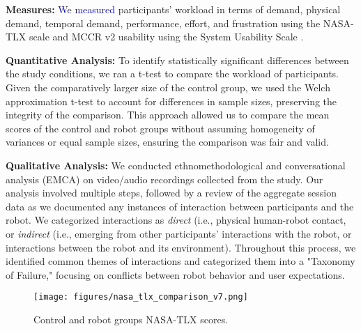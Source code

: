 \textbf{Measures:} \textcolor{blue}{We measured} participants' workload in terms of demand, physical demand, temporal demand, performance, effort, and frustration using the NASA-TLX scale \cite{hart2006nasa} and MCCR v2 usability using the System Usability Scale \cite{brooke1996sus}.


\textbf{Quantitative Analysis:} To identify statistically significant differences between the study conditions, we ran a t-test to compare the workload of participants. Given the comparatively larger size of the control group, we used the Welch approximation t-test to account for differences in sample sizes, preserving the integrity of the comparison. This approach allowed us to compare the mean scores of the control and robot groups without assuming homogeneity of variances or equal sample sizes, ensuring the comparison was fair and valid.

\textbf{Qualitative Analysis:} We conducted ethnomethodological and conversational analysis (EMCA) \cite{haddington2023emca} on video/audio recordings collected from the study. Our analysis involved multiple steps, followed by a review of the aggregate session data as we documented any instances of interaction between participants and the robot. We categorized interactions as \textit{direct} (i.e., physical human-robot contact, %
or \textit{indirect} (i.e., emerging from other participants' interactions with the robot, or interactions between the robot and its environment). Throughout this process, we identified common themes of interactions and categorized them into a "Taxonomy of Failure," focusing on conflicts between robot behavior and user expectations. %


\begin{figure}[t] 
	\centering 
	\texttt{[image: figures/nasa\_tlx\_comparison\_v7.png]} 
	\caption{Control and robot groups NASA-TLX \cite{hart2006nasa} scores.}%
	\label{fig:robot-sus-nasa} 
\end{figure}

